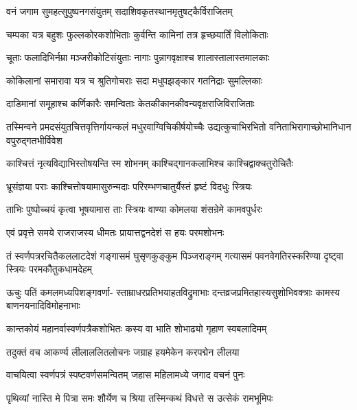 \twolineshloka
{वनं जगाम सुमहत्सुपुष्पनगसंयुतम्}
{सदाशिवकृतस्थानमृतुषट्कैर्विराजितम्}%

\twolineshloka
{चम्पका यत्र बहुशः फुल्लकोरकशोभिताः}
{कुर्वन्ति कामिनां तत्र हृच्छयार्तिं विलोकिताः}%

\twolineshloka
{चूताः फलादिभिर्नम्रा मञ्जरीकोटिसंयुताः}
{नागाः पुन्नागवृक्षाश्च शालास्तालास्तमालकाः}%

\twolineshloka
{कोकिलानां समारावा यत्र च श्रुतिगोचराः}
{सदा मधुपझङ्कार गतनिद्राः सुमल्लिकाः}%

\twolineshloka
{दाडिमानां समूहाश्च कर्णिकारैः समन्विताः}
{केतकीकानकीवन्यवृक्षराजिविराजिताः}%

\twolineshloka
{तस्मिन्वने प्रमदसंयुतचित्तवृत्तिर्गायन्कलं मधुरवाग्विचिकीर्षयोच्चैः}
{उद्यत्कुचाभिरभितो वनिताभिरागाच्छोभानिधान वपुरुद्गतभीर्विवेश}%

\twolineshloka
{काश्चित्तं नृत्यविद्याभिस्तोषयन्ति स्म शोभनम्}
{काश्चिद्गानकलाभिश्च काश्चिद्वाक्चतुरोचितैः}%

\twolineshloka
{भ्रूसंज्ञया पराः काश्चित्तोषयामासुरुन्मदाः}
{परिरम्भणचातुर्यैस्तं हृष्टं विदधुः स्त्रियः}%

\twolineshloka
{ताभिः पुष्पोच्चयं कृत्वा भूषयामास ताः स्त्रियः}
{वाण्या कोमलया शंसन्रेमे कामवपुर्धरः}%

\twolineshloka
{एवं प्रवृत्ते समये राजराजस्य धीमतः}
{प्रायात्तद्वनदेशं स हयः परमशोभनः}%

\fourlineindentedshloka
{तं स्वर्णपत्ररचितैकललाटदेशं}
{गङ्गासमं घुसृणकुङ्कुम पिञ्जराङ्गम्}
{गत्यासमं पवनवेगतिरस्करिण्या}
{दृष्ट्वा स्त्रियः परमकौतुकधामदेहम्}%

\fourlineindentedshloka
{ऊचुः पतिं कमलमध्यपिशङ्गवर्णा-}
{स्ताम्राधरप्रतिभयाहतविद्रुमाभाः}
{दन्तव्रजप्रमितहास्यसुशोभिवक्त्राः}
{कामस्य बाणनयनादिविमोहनाभाः}%


\twolineshloka
{कान्तकोयं महानर्वास्वर्णपत्रैकशोभितः}
{कस्य वा भाति शोभाढ्यो गृहाण स्वबलादिमम्}%


\twolineshloka
{तदुक्तं वच आकर्ण्य लीलाललितलोचनः}
{जग्राह हयमेकेन करपद्मेन लीलया}%

\twolineshloka
{वाचयित्वा स्वर्णपत्रं स्पष्टवर्णसमन्वितम्}
{जहास महिलामध्ये जगाद वचनं पुनः}%


\twolineshloka
{पृथिव्यां नास्ति मे पित्रा समः शौर्येण च श्रिया}
{तस्मिन्कथं विधत्ते स उत्सेकं रामभूमिपः}%

